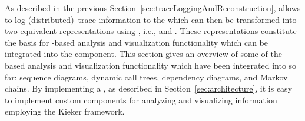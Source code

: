 \noindent As described in the previous Section~\ref{sec:traceLoggingAndReconstruction}, %
\KiekerTpmon{} allows to log (distributed)~trace information to the \MonitoringLog{} %
which can then be transformed into two equivalent \trace{} representations using %
\KiekerTpan{}, i.e., \executionTraces{} and \messageTraces{}. %
These representations constitute the basis for \trace{}-based analysis and 
visualization functionality which can be integrated into the \KiekerTpan{} %
component. %
This section gives an overview of some of the \trace{}-based analysis and visualization %
functionality which have been integrated into \KiekerTpan{} so far: sequence diagrams, dynamic call trees, dependency diagrams, and Markov chains. %
By implementing a \MonitoringRecordConsumer{}, as described in Section~\ref{sec:architecture}, %
it is easy to implement custom components for analyzing and visualizing \trace{} %
information employing the Kieker framework.

%
% 

